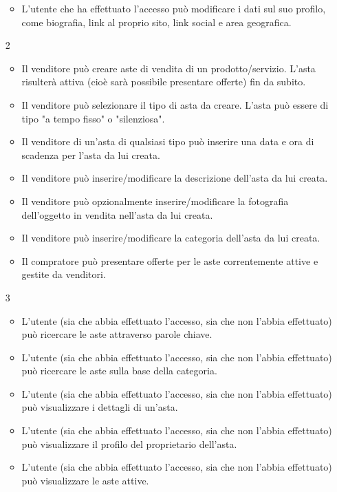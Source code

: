 \begin{itemize}
\begin{itemize}
                    \item L'utente che ha effettuato l'accesso può modificare i dati sul suo profilo, come biografia, link al proprio sito, link social e area geografica.
                \end{itemize}
            \item[2] 
                \begin{itemize}
                    \item Il venditore può creare aste di vendita di un prodotto/servizio. L'asta risulterà attiva (cioè sarà possibile presentare offerte) fin da subito.
                    \item Il venditore può selezionare il tipo di asta da creare. L'asta può essere di tipo "a tempo fisso" o "silenziosa".
                    \item Il venditore di un'asta di qualsiasi tipo può inserire una data e ora di scadenza per l'asta da lui creata.
                    \item Il venditore può inserire/modificare la descrizione dell'asta da lui creata.
                    \item Il venditore può opzionalmente inserire/modificare la fotografia dell'oggetto in vendita nell'asta da lui creata.
                    \item Il venditore può inserire/modificare la categoria dell'asta da lui creata.
                    \item Il compratore può presentare offerte per le aste correntemente attive e gestite da venditori.
                \end{itemize}
            \item[3]
                \begin{itemize}
                    \item L'utente (sia che abbia effettuato l'accesso, sia che non l'abbia effettuato) può ricercare le aste attraverso parole chiave.
                    \item L'utente (sia che abbia effettuato l'accesso, sia che non l'abbia effettuato) può ricercare le aste sulla base della categoria.
                    \item L'utente (sia che abbia effettuato l'accesso, sia che non l'abbia effettuato) può visualizzare i dettagli di un'asta.
                    \item L'utente (sia che abbia effettuato l'accesso, sia che non l'abbia effettuato) può visualizzare il profilo del proprietario dell'asta.
                    \item L'utente (sia che abbia effettuato l'accesso, sia che non l'abbia effettuato) può visualizzare le aste attive.

\end{itemize}
\end{itemize}
